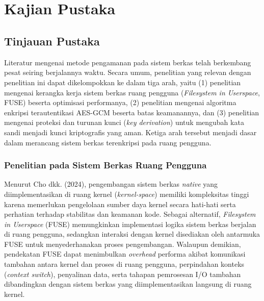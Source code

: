 \chapter[Kajian Pustaka]{\\ Kajian Pustaka}

\section{Tinjauan Pustaka}
Literatur mengenai metode pengamanan pada sistem berkas telah berkembang pesat seiring berjalannya waktu. Secara umum, penelitian yang relevan dengan penelitian ini dapat dikelompokkan ke dalam tiga arah, yaitu (1) penelitian mengenai kerangka kerja sistem berkas ruang pengguna (\textit{Filesystem in Userspace}, FUSE) beserta optimisasi performanya, (2) penelitian mengenai algoritma enkripsi terautentikasi AES-GCM beserta batas keamanannya, dan (3) penelitian mengenai proteksi dan turunan kunci (\textit{key derivation}) untuk mengubah kata sandi menjadi kunci kriptografis yang aman. Ketiga arah tersebut menjadi dasar dalam merancang sistem berkas terenkripsi pada ruang pengguna.
 
\subsection{Penelitian pada Sistem Berkas Ruang Pengguna}
Menurut Cho dkk. (2024)\cite{ChoRFUSE}, pengembangan sistem berkas \textit{native} yang diimplementasikan di ruang kernel (\textit{kernel-space}) memiliki kompleksitas tinggi karena memerlukan pengelolaan sumber daya kernel secara hati-hati serta perhatian terhadap stabilitas dan keamanan kode. Sebagai alternatif, \textit{Filesystem in Userspace} (FUSE) memungkinkan implementasi logika sistem berkas berjalan di ruang pengguna, sedangkan interaksi dengan kernel disediakan oleh antarmuka FUSE untuk menyederhanakan proses pengembangan\cite{Lembke2022DEFUSE:,Zou2022UserLevel}. Walaupun demikian, pendekatan FUSE dapat menimbulkan \textit{overhead} performa akibat komunikasi tambahan antara kernel dan proses di ruang pengguna, perpindahan konteks (\textit{context switch}), penyalinan data, serta tahapan pemrosesan I/O tambahan dibandingkan dengan sistem berkas yang diimplementasikan langsung di ruang kernel\cite{Holtrop2022LDPFUSE}.

